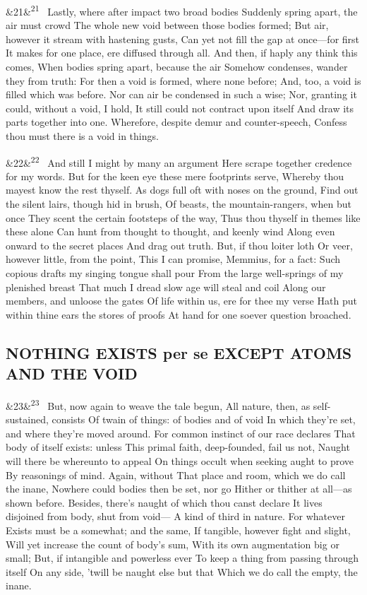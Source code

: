 \documentclass[12pt]{article}
\newcommand{\para}[1][]{\par\noindent\ifx&#1&\else\textsuperscript{\footnotesize #1}~\fi}
\begin{document}
\para[21] Lastly, where after impact two broad bodies Suddenly spring apart, the air must crowd The whole new void between those bodies formed; But air, however it stream with hastening gusts, Can yet not fill the gap at once---for first It makes for one place, ere diffused through all. And then, if haply any think this comes, When bodies spring apart, because the air Somehow condenses, wander they from truth: For then a void is formed, where none before; And, too, a void is filled which was before. Nor can air be condensed in such a wise; Nor, granting it could, without a void, I hold, It still could not contract upon itself And draw its parts together into one. Wherefore, despite demur and counter-speech, Confess thou must there is a void in things.

\para[22] And still I might by many an argument Here scrape together credence for my words. But for the keen eye these mere footprints serve, Whereby thou mayest know the rest thyself. As dogs full oft with noses on the ground, Find out the silent lairs, though hid in brush, Of beasts, the mountain-rangers, when but once They scent the certain footsteps of the way, Thus thou thyself in themes like these alone Can hunt from thought to thought, and keenly wind Along even onward to the secret places And drag out truth. But, if thou loiter loth Or veer, however little, from the point, This I can promise, Memmius, for a fact: Such copious drafts my singing tongue shall pour From the large well-springs of my plenished breast That much I dread slow age will steal and coil Along our members, and unloose the gates Of life within us, ere for thee my verse Hath put within thine ears the stores of proofs At hand for one soever question broached.

\subsection*{NOTHING EXISTS per se EXCEPT ATOMS AND THE VOID}

\para[23] But, now again to weave the tale begun, All nature, then, as self-sustained, consists Of twain of things: of bodies and of void In which they're set, and where they're moved around. For common instinct of our race declares That body of itself exists: unless This primal faith, deep-founded, fail us not, Naught will there be whereunto to appeal On things occult when seeking aught to prove By reasonings of mind. Again, without That place and room, which we do call the inane, Nowhere could bodies then be set, nor go Hither or thither at all---as shown before. Besides, there's naught of which thou canst declare It lives disjoined from body, shut from void--- A kind of third in nature. For whatever Exists must be a somewhat; and the same, If tangible, however fight and slight, Will yet increase the count of body's sum, With its own augmentation big or small; But, if intangible and powerless ever To keep a thing from passing through itself On any side, 'twill be naught else but that Which we do call the empty, the inane.
\end{document}
